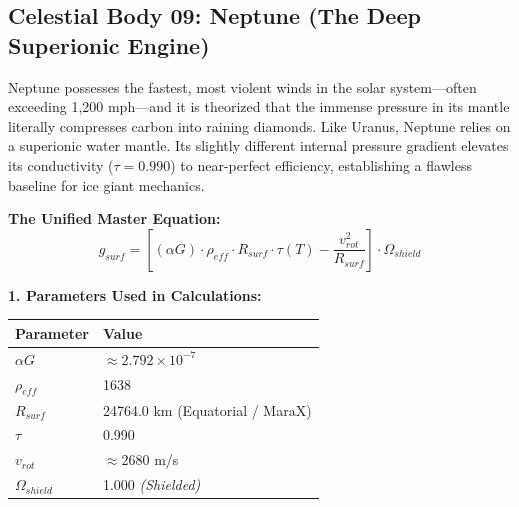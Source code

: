 \documentclass[11pt, a4paper]{article}
\begin{document}
\clearpage
\subsection{Celestial Body 09: Neptune (The Deep Superionic Engine)}
  Neptune possesses the fastest, most violent winds in the solar system—often exceeding 1,200 mph—and it is theorized that the immense pressure in its mantle literally compresses carbon into raining diamonds. Like Uranus, Neptune relies on a superionic water mantle. Its slightly different internal pressure gradient elevates its conductivity ($\tau = 0.990$) to near-perfect efficiency, establishing a flawless baseline for ice giant mechanics.

  \vspace{0.5em}
  \noindent \textbf{The Unified Master Equation:}
  $$ g_{surf} = \left[ (\alpha G) \cdot \rho_{eff} \cdot R_{surf} \cdot \tau(T) - \frac{v_{rot}^2}{R_{surf}} \right] \cdot \Omega_{shield} $$

  \vspace{0.5em}
  \noindent \textbf{1. Parameters Used in Calculations:} \\[0.5em]
  \begingroup
  \renewcommand{\arraystretch}{1.3}
  \hspace*{2em}
  \begin{tabular}{|l|l|}
    \hline
    \textbf{Parameter} & \textbf{Value} \\ \hline
    $\alpha G$ & $\approx 2.792 \times 10^{-7}$ \\ \hline
    $\rho_{eff}$ & 1638 \\ \hline
    $R_{surf}$ & 24764.0 km (Equatorial / MaraX) \\ \hline
    $\tau$ & 0.990 \\ \hline
    $v_{rot}$ & $\approx 2680$ m/s \\ \hline
    $\Omega_{shield}$ & 1.000 \textit{(Shielded)} \\ \hline
  \end{tabular}
  \endgroup
\end{document}
